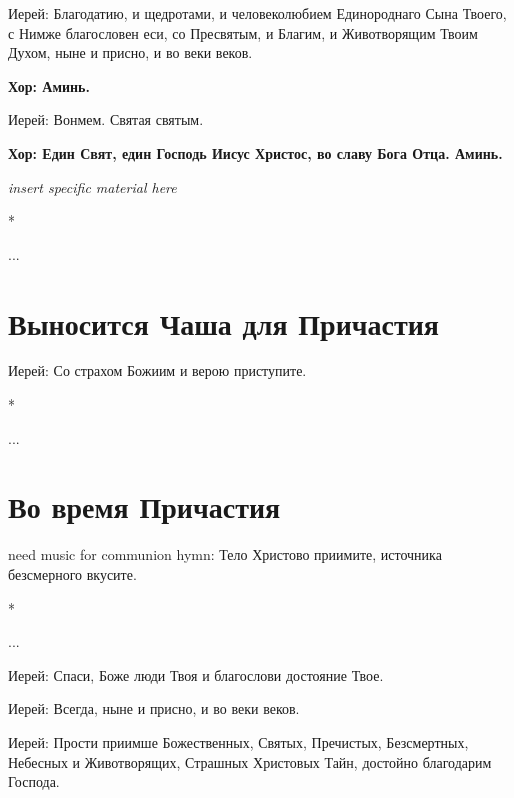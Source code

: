 \documentclass[12pt,a4paper,titlepage]{report}
\begin{document}
\begin{paracol}[1]{2}
  Иерей: Благодатию, и щедротами, и человеколюбием Единороднаго Сына Твоего, с Нимже благословен еси, со Пресвятым, и Благим, и Животворящим Твоим Духом, ныне и присно, и во веки веков.

  \textbf{Хор: Аминь.}

  Иерей: Вонмем. Святая святым.

  \textbf{Хор: Един Свят, един Господь Иисус Христос, во славу Бога Отца. Аминь.}

  \textit {\foreignlanguage{english}{insert specific material here}}

  \switchcolumn[0]*

  ...

  \switchcolumn[1]

  \section*{Выносится Чаша для Причастия}

  Иерей: Со страхом Божиим и верою приступите.


  \switchcolumn[0]*

  ...

  \switchcolumn[1]

  \section*{Во время Причастия}

  need music for communion hymn: Тело Христово приимите, источника безсмерного вкусите.

  \switchcolumn[0]*

  ...

  \switchcolumn[1]

  Иерей: Спаси, Боже люди Твоя и благослови достояние Твое.


  Иерей: Всегда, ныне и присно, и во веки веков.


  Иерей: Прости приимше Божественных, Святых, Пречистых, Безсмертных, Небесных и Животворящих, Страшных Христовых Тайн, достойно благодарим Господа.


\end{paracol}
\end{document}
